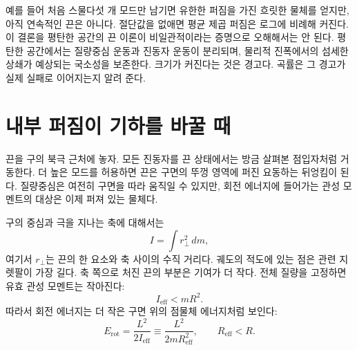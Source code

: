 예를 들어 처음 스물다섯 개 모드만 남기면 유한한 퍼짐을 가진 흐릿한 물체를 얻지만, 아직 연속적인 끈은 아니다. 절단값을 없애면 평균 제곱 퍼짐은 로그에 비례해 커진다. 이 결론을 평탄한 공간의 끈 이론이 비일관적이라는 증명으로 오해해서는 안 된다. 평탄한 공간에서는 질량중심 운동과 진동자 운동이 분리되며, 물리적 진폭에서의 섬세한 상쇄가 예상되는 국소성을 보존한다. 크기가 커진다는 것은 경고다. 곡률은 그 경고가 실제 실패로 이어지는지 알려 준다.

\section{내부 퍼짐이 기하를 바꿀 때}

끈을 구의 북극 근처에 놓자. 모든 진동자를 끈 상태에서는 방금 살펴본 점입자처럼 거동한다. 더 높은 모드를 허용하면 끈은 구면의 뚜껑 영역에 퍼진 요동하는 뒤엉킴이 된다. 질량중심은 여전히 구면을 따라 움직일 수 있지만, 회전 에너지에 들어가는 관성 모멘트의 대상은 이제 퍼져 있는 물체다.

구의 중심과 극을 지나는 축에 대해서는
\begin{equation}
  I=\int r_\perp^2\,dm,
  \label{eq:l09-extended-inertia}
\end{equation}
여기서 \(r_\perp\)는 끈의 한 요소와 축 사이의 수직 거리다. 궤도의 적도에 있는 점은 관련 지렛팔이 가장 길다. 축 쪽으로 처진 끈의 부분은 기여가 더 작다. 전체 질량을 고정하면 유효 관성 모멘트는 작아진다:
\begin{equation}
  I_{\mathrm{eff}}<mR^2.
  \label{eq:l09-inertia-reduction}
\end{equation}
따라서 회전 에너지는 더 작은 구면 위의 점물체 에너지처럼 보인다:
\begin{equation}
  E_{\mathrm{rot}}
  =\frac{L^2}{2I_{\mathrm{eff}}}
  \equiv \frac{L^2}{2mR_{\mathrm{eff}}^2},
  \qquad R_{\mathrm{eff}}<R.
  \label{eq:l09-effective-radius}
\end{equation}

\begin{classroomqa}\end{classroomqa}

